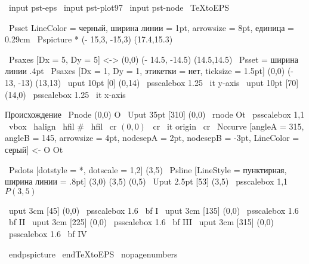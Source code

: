 \ input pst-eps \ input pst-plot97 \ input pst-node \ TeXtoEPS

\ Psset {LineColor = черный, ширина линии = 1pt, arrowsize = 8pt, единица = 0.29cm}
\ Pspicture * (- 15,3, -15,3) (17.4,15.3)

\ Psaxes [Dx = 5, Dy = 5] {<->} (0,0) (- 14.5, -14.5) (14.5,14.5)
\ Psset {= ширина линии .4pt}
\ Psaxes [Dx = 1, Dy = 1, этикетки = нет, ticksize = 1.5pt] (0,0) (- 13, -13) (13,13)
\ uput {10pt} [0] (0,14) {\ psscalebox {1.25} {\ it y-axis}}
\ uput {10pt} [70] (14,0) {\ psscalebox {1.25} {\ it x-axis}}

Происхождение%
\ Pnode (0,0) {O}
\ Uput {35pt} [310] (0,0) {\ rnode {Ot} {\ psscalebox {1,1} {
        \ vbox {\ halign {\ hfil # \ hfil \ cr $ (0,0) $ \ cr \ it origin \ cr}}}}}
\ Nccurve [angleA = 315, angleB = 145, arrowsize = 4pt,
        nodesepA = 2pt, nodesepB = -3pt, LineColor = серый] {<-} {O} {} Ot

\ Psdots [dotstyle = *, dotscale = 1,2] (3,5)
\ Psline [LineStyle = пунктирная, ширина линии = .8pt] (3,0) (3,5) (0,5)
\ Uput {2.5pt} [53] (3,5) {\ psscalebox {1,1} {$ P (3,5) $}}


\ uput {3cm} [45] (0,0) {\ psscalebox {1.6} {\ bf I}}
\ uput {3cm} [135] (0,0) {\ psscalebox {1.6} {\ bf II}}
\ uput {3cm} [225] (0,0) {\ psscalebox {1.6} {\ bf III}}
\ uput {3cm} [315] (0,0) {\ psscalebox {1.6} {\ bf IV}}

\ endpspicture
\ endTeXtoEPS
\ nopagenumbers
